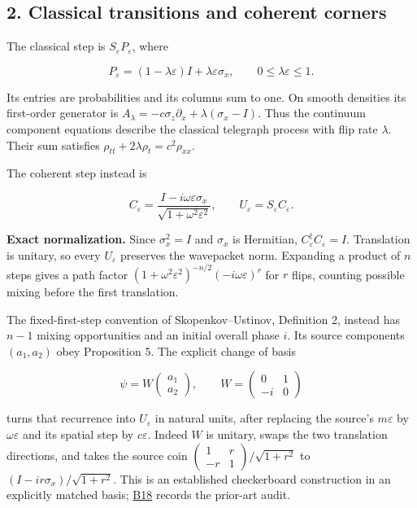 \documentclass[11pt,a4paper]{article}
\begin{document}
\hypertarget{classical-transitions-and-coherent-corners}{%
\subsection{2. Classical transitions and coherent
corners}\label{classical-transitions-and-coherent-corners}}

The classical step is \(S_\varepsilon P_\varepsilon\), where

\[
P_\varepsilon=(1-\lambda\varepsilon)I+
\lambda\varepsilon\sigma_x,\qquad 0\le\lambda\varepsilon\le1.
\]

Its entries are probabilities and its columns sum to one. On smooth
densities its first-order generator is
\(A_\lambda=-c\sigma_z\partial_x+\lambda(\sigma_x-I)\). Thus the
continuum component equations describe the classical telegraph process
with flip rate \(\lambda\). Their sum satisfies
\(\rho_{tt}+2\lambda\rho_t=c^2\rho_{xx}\).

The coherent step instead is

\[
C_\varepsilon=\frac{I-i\omega\varepsilon\sigma_x}
 {\sqrt{1+\omega^2\varepsilon^2}},\qquad
U_\varepsilon=S_\varepsilon C_\varepsilon.
\]

\textbf{Exact normalization.} Since \(\sigma_x^2=I\) and \(\sigma_x\) is
Hermitian, \(C_\varepsilon^\dagger C_\varepsilon=I\). Translation is
unitary, so every \(U_\varepsilon\) preserves the wavepacket norm.
Expanding a product of \(n\) steps gives a path factor
\((1+\omega^2\varepsilon^2)^{-n/2}(-i\omega\varepsilon)^r\) for \(r\)
flips, counting possible mixing before the first translation.

The fixed-first-step convention of Skopenkov--Ustinov, Definition 2,
instead has \(n-1\) mixing opportunities and an initial overall phase
\(i\). Its source components \((a_1,a_2)\) obey Proposition 5. The
explicit change of basis

\[
\psi=W\begin{pmatrix}a_1\\a_2\end{pmatrix},\qquad
W=\begin{pmatrix}0&1\\-i&0\end{pmatrix}
\]

turns that recurrence into \(U_\varepsilon\) in natural units, after
replacing the source's \(m\varepsilon\) by \(\omega\varepsilon\) and its
spatial step by \(c\varepsilon\). Indeed \(W\) is unitary, swaps the two
translation directions, and takes the source coin
\(\left(\begin{smallmatrix}1&r\\-r&1\end{smallmatrix}\right)/\sqrt{1+r^2}\)
to \((I-ir\sigma_x)/\sqrt{1+r^2}\). This is an established checkerboard
construction in an explicitly matched basis;
\href{../references/batches/B18.md}{B18} records the prior-art audit.
\end{document}
